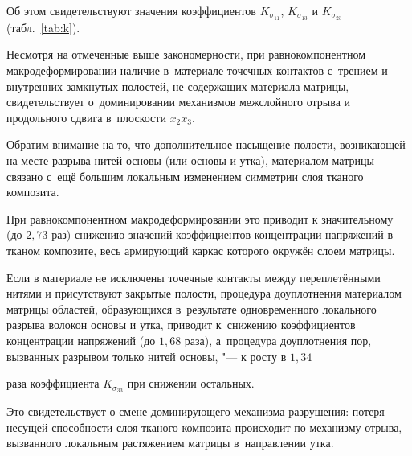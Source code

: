 Об этом свидетельствуют значения коэффициентов $K_{\sigma_{11}}$, $K_{\sigma_{13}}$ и $K_{\sigma_{23}}$ (табл.~\ref{tab:k}). 

Несмотря на отмеченные выше закономерности, при равнокомпонентном макродеформировании наличие в~материале точечных контактов с~трением и внутренних замкнутых полостей, не содержащих материала матрицы, свидетельствует о~доминировании механизмов межслойного отрыва и продольного сдвига в~плоскости $x_2 x_3$.



Обратим внимание на то, что дополнительное насыщение полости, возникающей на месте разрыва нитей основы (или основы и утка), материалом матрицы связано с~ещё большим локальным изменением симметрии слоя тканого композита. 

При равнокомпонентном макродеформировании это приводит к значительному (до $2{,}73$ раз) снижению значений коэффициентов концентрации напряжений в тканом композите, весь армирующий каркас которого окружён слоем матрицы.

Если в материале не исключены точечные контакты между переплетёнными нитями и присутствуют закрытые полости, процедура доуплотнения материалом матрицы областей, образующихся в~результате одновременного локального разрыва волокон основы и утка, приводит к~снижению коэффициентов концентрации напряжений (до $1{,}68$ раза), а~процедура доуплотнения пор, вызванных разрывом только нитей основы, "--- к росту в $1{,}34$

раза коэффициента $K_{\sigma_{33}}$ при снижении остальных. 

Это свидетельствует о смене доминирующего механизма разрушения: потеря несущей способности слоя тканого композита происходит по механизму отрыва, вызванного локальным растяжением матрицы в~направлении утка.

%








